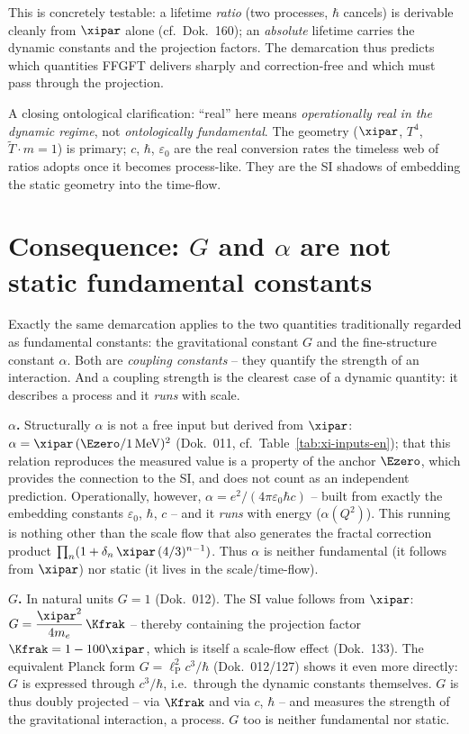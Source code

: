 This is concretely testable: a lifetime \emph{ratio} (two processes, $\hbar$
cancels) is derivable cleanly from $\xipar$ alone (cf.~Dok.~160); an \emph{absolute}
lifetime carries the dynamic constants and the projection factors. The demarcation
thus predicts which quantities FFGFT delivers sharply and correction-free and
which must pass through the projection.

A closing ontological clarification: ``real'' here means \emph{operationally real
in the dynamic regime}, not \emph{ontologically fundamental}. The geometry
($\xipar$, $T^4$, $\tilde T\cdot m=1$) is primary; $c$, $\hbar$, $\varepsilon_0$
are the real conversion rates the timeless web of ratios adopts once it becomes
process-like. They are the SI shadows of embedding the static geometry into the
time-flow.

\section{Consequence: $G$ and $\alpha$ are not static fundamental constants}
\label{sec:G-alpha}

Exactly the same demarcation applies to the two quantities traditionally regarded
as fundamental constants: the gravitational constant $G$ and the fine-structure
constant $\alpha$. Both are \emph{coupling constants} -- they quantify the
strength of an interaction. And a coupling strength is the clearest case of a
dynamic quantity: it describes a process and it \emph{runs} with scale.

\textbf{$\alpha$.} Structurally $\alpha$ is not a free input but derived from
$\xipar$: $\alpha=\xipar\,(\Ezero/1\,\mathrm{MeV})^2$ (Dok.~011,
cf.~Table~\ref{tab:xi-inputs-en}); that this relation reproduces the measured
value is a property of the anchor $\Ezero$, which provides the connection to the
SI, and does not count as an independent prediction. Operationally, however,
$\alpha=e^2/(4\pi\varepsilon_0\hbar c)$ -- built from exactly the embedding
constants $\varepsilon_0$, $\hbar$, $c$ -- and it \emph{runs} with energy
($\alpha(Q^2)$). This running is nothing other than the scale flow that also
generates the fractal correction product
$\prod_n(1+\delta_n\,\xipar\,(4/3)^{n-1})$. Thus $\alpha$ is neither fundamental
(it follows from $\xipar$) nor static (it lives in the scale/time-flow).

\textbf{$G$.} In natural units $G=1$ (Dok.~012). The SI value follows from
$\xipar$: $G=\dfrac{\xipar^2}{4m_e}\,\Kfrak$ -- thereby containing the projection
factor $\Kfrak=1-100\xipar$, which is itself a scale-flow effect (Dok.~133). The
equivalent Planck form $G=\ell_{\mathrm P}^2 c^3/\hbar$ (Dok.~012/127) shows it
even more directly: $G$ is expressed through $c^3/\hbar$, i.e.\ through the
dynamic constants themselves. $G$ is thus doubly projected -- via $\Kfrak$ and via
$c$, $\hbar$ -- and measures the strength of the gravitational interaction, a
process. $G$ too is neither fundamental nor static.

